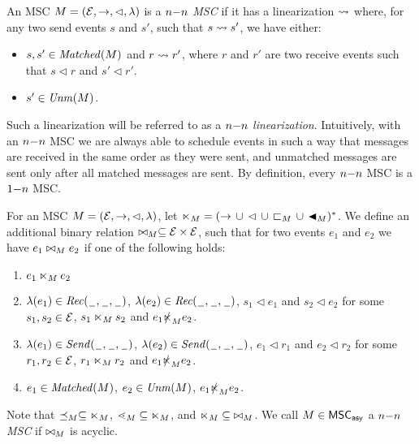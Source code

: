 \documentclass{article}
\begin{document}
\begin{definition}[$\nn$ MSC]\label{def:n_n}
	An MSC $M = (\mathcal{E},\to,\lhd,\lambda)$ is a \emph{$\nn$ MSC} if it has a linearization $\rightsquigarrow$ where, for any two send events $s$ and $s'$, such that $s \rightsquigarrow s'$, we have either:
	\begin{itemize}\itemsep=0.5ex
		\item $s,s' \in \mathit{Matched}(M)$ and $r \rightsquigarrow r'$, where $r$ and $r'$ are two receive events such that $s \lhd r$ and $s' \lhd r'$.
		\item $s' \in \mathit{Unm}(M)$.
	\end{itemize}
\end{definition}

Such a linearization will be referred to as a \emph{$\nn$ linearization}. Intuitively, with an $\nn$ MSC we are always able to schedule events in such a way that messages are received in the same order as they were sent, and unmatched messages are sent only after all matched messages are sent. By definition, every $\nn$ MSC is a $1\mathsf{-}n$ MSC. 

\begin{definition} [$\nn$ alternative]\label{def:n_n_alt}
For an MSC $M = (\mathcal{E},\to,\lhd,\lambda)$, let ${\ltimes}_M = ({\to} \,\cup\, {\lhd} \,\cup\, {\sqsubset_M} \,\cup\, {\blacktriangleleft_M})^\ast$. We define an additional binary relation $\bowtie_M \subseteq \mathcal{E} \times \mathcal{E}$, such that for two events $e_1$ and $e_2$ we have $e_1 \bowtie_M e_2$ if one of the following holds:
\begin{enumerate}\itemsep=0.5ex
	\item $e_1 \ltimes_M e_2$
	\item $\lambda(e_1) \in {\mathit{Rec}(\hspace{0.1em}\underline{\hspace{0.5em}}\hspace{0.1em},\hspace{0.1em}\underline{\hspace{0.5em}}\hspace{0.1em},\hspace{0.1em}\underline{\hspace{0.5em}}\hspace{0.1em})}$, $\lambda(e_2) \in {\mathit{Rec}(\hspace{0.1em}\underline{\hspace{0.5em}}\hspace{0.1em},\hspace{0.1em}\underline{\hspace{0.5em}}\hspace{0.1em},\hspace{0.1em}\underline{\hspace{0.5em}}\hspace{0.1em})}$, $s_1 \lhd e_1$ and $s_2 \lhd e_2$ for some $s_1,s_2 \in \mathcal{E}$, $s_1 \ltimes_M s_2$ and $e_1 \slashed{\ltimes}_M e_2$.
	\item $\lambda(e_1) \in {\mathit{Send}(\hspace{0.1em}\underline{\hspace{0.5em}}\hspace{0.1em},\hspace{0.1em}\underline{\hspace{0.5em}}\hspace{0.1em},\hspace{0.1em}\underline{\hspace{0.5em}}\hspace{0.1em})}$, $\lambda(e_2) \in {\mathit{Send}(\hspace{0.1em}\underline{\hspace{0.5em}}\hspace{0.1em},\hspace{0.1em}\underline{\hspace{0.5em}}\hspace{0.1em},\hspace{0.1em}\underline{\hspace{0.5em}}\hspace{0.1em})}$, $e_1 \lhd r_1$ and $e_2 \lhd r_2$ for some $r_1,r_2 \in \mathcal{E}$, $r_1 \ltimes_M r_2$ and $e_1 \slashed{\ltimes}_M e_2$.
	\item $e_1 \in \mathit{Matched}(M)$, $e_2 \in \mathit{Unm}(M)$, $e_1 \slashed{\ltimes}_M e_2$.
\end{enumerate}

Note that $\preceq_M \subseteq \ltimes_M$, $\lessdot_M \subseteq \ltimes_M$, and $\ltimes_M \subseteq\; \bowtie_M$. We call $M \in \mathsf{MSC}_{\mathsf{asy}}$ a \emph{$\nn$ MSC}
if ${\bowtie_M}$ is acyclic.
\end{definition}
\end{document}
